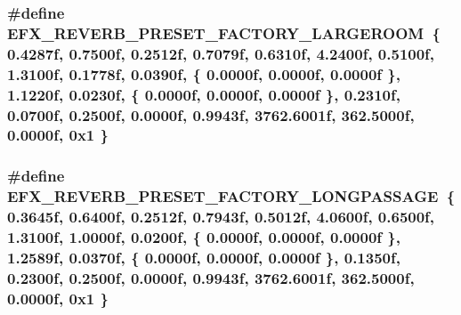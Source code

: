 \subsubsection[{\texorpdfstring{E\+F\+X\+\_\+\+R\+E\+V\+E\+R\+B\+\_\+\+P\+R\+E\+S\+E\+T\+\_\+\+F\+A\+C\+T\+O\+R\+Y\+\_\+\+L\+A\+R\+G\+E\+R\+O\+OM}{EFX_REVERB_PRESET_FACTORY_LARGEROOM}}]{\setlength{\rightskip}{0pt plus 5cm}\#define E\+F\+X\+\_\+\+R\+E\+V\+E\+R\+B\+\_\+\+P\+R\+E\+S\+E\+T\+\_\+\+F\+A\+C\+T\+O\+R\+Y\+\_\+\+L\+A\+R\+G\+E\+R\+O\+OM~\{ 0.\+4287f, 0.\+7500f, 0.\+2512f, 0.\+7079f, 0.\+6310f, 4.\+2400f, 0.\+5100f, 1.\+3100f, 0.\+1778f, 0.\+0390f, \{ 0.\+0000f, 0.\+0000f, 0.\+0000f \}, 1.\+1220f, 0.\+0230f, \{ 0.\+0000f, 0.\+0000f, 0.\+0000f \}, 0.\+2310f, 0.\+0700f, 0.\+2500f, 0.\+0000f, 0.\+9943f, 3762.\+6001f, 362.\+5000f, 0.\+0000f, 0x1 \}}\hypertarget{efx-presets_8h_a702eccce6fa335c50cd88b25585c99ed}{}\label{efx-presets_8h_a702eccce6fa335c50cd88b25585c99ed}
\subsubsection[{\texorpdfstring{E\+F\+X\+\_\+\+R\+E\+V\+E\+R\+B\+\_\+\+P\+R\+E\+S\+E\+T\+\_\+\+F\+A\+C\+T\+O\+R\+Y\+\_\+\+L\+O\+N\+G\+P\+A\+S\+S\+A\+GE}{EFX_REVERB_PRESET_FACTORY_LONGPASSAGE}}]{\setlength{\rightskip}{0pt plus 5cm}\#define E\+F\+X\+\_\+\+R\+E\+V\+E\+R\+B\+\_\+\+P\+R\+E\+S\+E\+T\+\_\+\+F\+A\+C\+T\+O\+R\+Y\+\_\+\+L\+O\+N\+G\+P\+A\+S\+S\+A\+GE~\{ 0.\+3645f, 0.\+6400f, 0.\+2512f, 0.\+7943f, 0.\+5012f, 4.\+0600f, 0.\+6500f, 1.\+3100f, 1.\+0000f, 0.\+0200f, \{ 0.\+0000f, 0.\+0000f, 0.\+0000f \}, 1.\+2589f, 0.\+0370f, \{ 0.\+0000f, 0.\+0000f, 0.\+0000f \}, 0.\+1350f, 0.\+2300f, 0.\+2500f, 0.\+0000f, 0.\+9943f, 3762.\+6001f, 362.\+5000f, 0.\+0000f, 0x1 \}}\hypertarget{efx-presets_8h_a2e0c4cc4ac7d102d391c8edc50417df5}{}\label{efx-presets_8h_a2e0c4cc4ac7d102d391c8edc50417df5}
